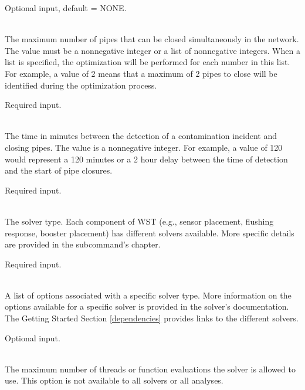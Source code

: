 \begin{description}[topsep=0pt,parsep=0.5em,itemsep=-0.4em]
\begin{description}[topsep=0pt,parsep=0.5em,itemsep=-0.4em]
\begin{description}[topsep=0pt,parsep=0.5em,itemsep=-0.4em]
                Optional input, default = NONE.
      \item[{max pipes}]\hfill
\\The maximum number of pipes that can be closed simultaneously in the
                network. The value must be a nonnegative integer or a list of
                nonnegative integers. When a list is specified, the optimization
                will be performed for each number in this list. For example, a value of 
                2 means that a maximum of 2 pipes to close will be identified 
                during the optimization process.
                
                Required input.
      \item[{response time}]\hfill
\\The time in minutes between the detection of a contamination incident and 
                closing pipes. The value is a nonnegative integer. For example, 
                a value of 120 would represent a 120 minutes or a 2 hour delay between 
                the time of detection and the start of pipe closures.
                
                Required input.
    \end{description}
  \end{description}
  \item[{solver}]\hfill
  \begin{description}[topsep=0pt,parsep=0.5em,itemsep=-0.4em]
    \item[{type}]\hfill
\\The solver type. Each component of WST
				(e.g., sensor placement, flushing response, booster 
				placement) has different 
				solvers available. More specific details are provided in 
				the subcommand's chapter.
                
                Required input.
    \item[{options}]\hfill
\\A list of options associated with a specific solver type. More
            information on the options available for a specific solver
            is provided in the solver's documentation. The Getting
            Started Section \ref{dependencies} provides links to the
            different solvers.
            
            Optional input.
    \item[{threads}]\hfill
\\The maximum number of threads or function evaluations the solver is
                allowed to use.  This option is not available to all solvers or all analyses.
                

\end{description}
\end{description}
